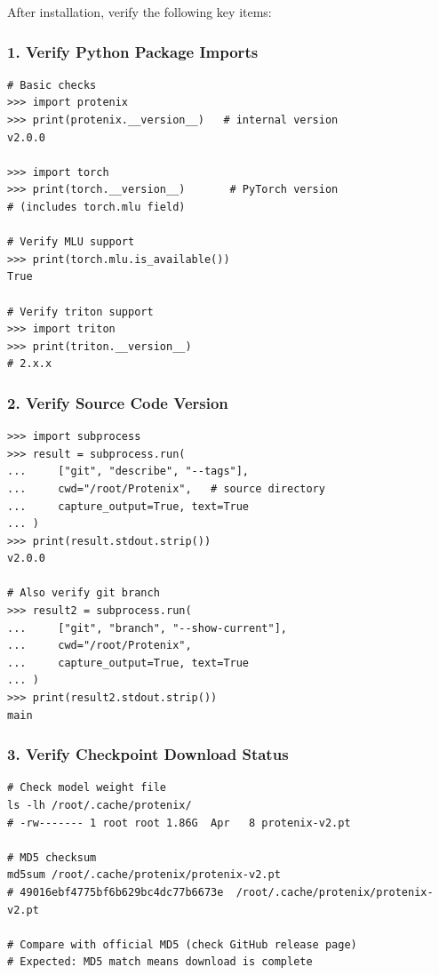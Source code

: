 \documentclass[12pt,a4paper]{article}
\begin{document}
After installation, verify the following key items:

\subsubsection{1. Verify Python Package Imports}

\begin{verbatim}
# Basic checks
>>> import protenix
>>> print(protenix.__version__)   # internal version
v2.0.0

>>> import torch
>>> print(torch.__version__)       # PyTorch version
# (includes torch.mlu field)

# Verify MLU support
>>> print(torch.mlu.is_available())
True

# Verify triton support
>>> import triton
>>> print(triton.__version__)
# 2.x.x
\end{verbatim}

\subsubsection{2. Verify Source Code Version}

\begin{verbatim}
>>> import subprocess
>>> result = subprocess.run(
...     ["git", "describe", "--tags"],
...     cwd="/root/Protenix",   # source directory
...     capture_output=True, text=True
... )
>>> print(result.stdout.strip())
v2.0.0

# Also verify git branch
>>> result2 = subprocess.run(
...     ["git", "branch", "--show-current"],
...     cwd="/root/Protenix",
...     capture_output=True, text=True
... )
>>> print(result2.stdout.strip())
main
\end{verbatim}

\subsubsection{3. Verify Checkpoint Download Status}

\begin{verbatim}
# Check model weight file
ls -lh /root/.cache/protenix/
# -rw------- 1 root root 1.86G  Apr   8 protenix-v2.pt

# MD5 checksum
md5sum /root/.cache/protenix/protenix-v2.pt
# 49016ebf4775bf6b629bc4dc77b6673e  /root/.cache/protenix/protenix-v2.pt

# Compare with official MD5 (check GitHub release page)
# Expected: MD5 match means download is complete
\end{verbatim}
\end{document}
